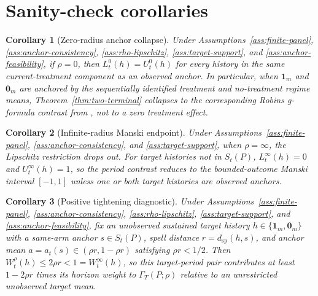 \documentclass[11pt]{article}
\theoremstyle{definition}
\theoremstyle{plain}
\newtheorem{corollary}{Corollary}
\theoremstyle{remark}
\begin{document}
\section{Sanity-check corollaries}
\begin{corollary}[Zero-radius anchor collapse]\label{cor:zero-radius}
Under Assumptions~\ref{ass:finite-panel}, \ref{ass:anchor-consistency}, \ref{ass:rho-lipschitz}, \ref{ass:target-support}, and \ref{ass:anchor-feasibility}, if \(\rho=0\), then \(L_t^0(h)=U_t^0(h)\) for every history in the same current-treatment component as an observed anchor.  In particular, when \(\mathbf{1}_m\) and \(\mathbf{0}_m\) are anchored by the sequentially identified treatment and no-treatment regime means, Theorem~\ref{thm:two-terminal} collapses to the corresponding Robins g-formula contrast from \citet{Robins1986}, not to a zero treatment effect.
\end{corollary}

\begin{corollary}[Infinite-radius Manski endpoint]\label{cor:infinite-radius}
Under Assumptions~\ref{ass:finite-panel}, \ref{ass:anchor-consistency}, and \ref{ass:target-support}, when \(\rho=\infty\), the Lipschitz restriction drops out.  For target histories not in \(S_t(P)\), \(L_t^\infty(h)=0\) and \(U_t^\infty(h)=1\), so the period contrast reduces to the bounded-outcome Manski interval \([-1,1]\) unless one or both target histories are observed anchors.
\end{corollary}

\begin{corollary}[Positive tightening diagnostic]\label{cor:positive-tightening}
Under Assumptions~\ref{ass:finite-panel}, \ref{ass:anchor-consistency}, \ref{ass:rho-lipschitz}, \ref{ass:target-support}, and \ref{ass:anchor-feasibility}, fix an unobserved sustained target history \(h\in\{\mathbf{1}_m,\mathbf{0}_m\}\) with a same-arm anchor \(s\in S_t(P)\), spell distance \(r=d_{\mathrm{sp}}(h,s)\), and anchor mean \(a=a_t(s)\in(\rho r,1-\rho r)\) satisfying \(\rho r<1/2\).  Then \(W_t^\rho(h)\le 2\rho r<1=W_t^\infty(h)\), so this target-period pair contributes at least \(1-2\rho r\) times its horizon weight to \(\Gamma_T(P;\rho)\) relative to an unrestricted unobserved target mean.
\end{corollary}
\end{document}
